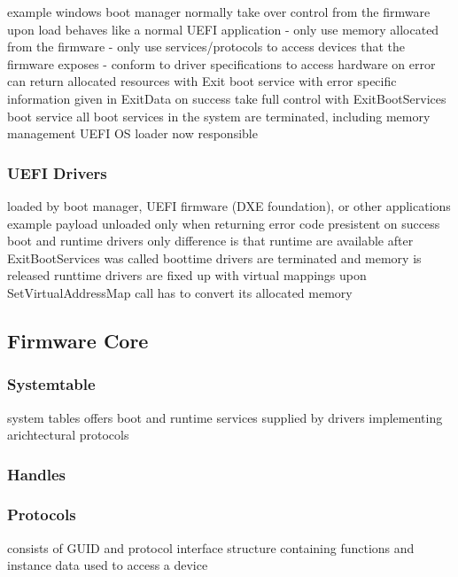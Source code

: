 example windows boot manager
normally take over control from the firmware
upon load behaves like a normal UEFI application
- only use memory allocated from the firmware
- only use services/protocols to access devices that the firmware exposes
- conform to driver specifications to access hardware
on error can return allocated resources with Exit boot service with error specific information given in ExitData
on success take full control with ExitBootServices boot service
all boot services in the system are terminated, including memory management
UEFI OS loader now responsible

\subsubsection{UEFI Drivers}


loaded by boot manager, UEFI firmware (DXE foundation), or other applications
example payload
unloaded only when returning error code
presistent on success
boot and runtime drivers
only difference is that runtime are available after ExitBootServices was called
boottime drivers are terminated and memory is released
runttime drivers are fixed up with virtual mappings upon SetVirtualAddressMap call
has to convert its allocated memory

\subsection{Firmware Core}
\subsubsection{Systemtable}
system tables offers boot and runtime services
supplied by drivers implementing arichtectural protocols %
\subsubsection{Handles}
\cite[7.3 Protocol Handler Services]{uefi-spec}
\subsubsection{Protocols}
consists of GUID and protocol interface structure containing functions and instance data used to access a device

